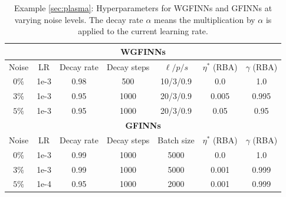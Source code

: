 \documentclass[final]{siamltex}
\begin{document}
\begin{appendices}
\begin{table}[t]
\centering
\begin{tabular}{|c||c|c|c|c|c|c|}
\hline
\multicolumn{7}{|c|}{\textbf{WGFINNs}} \\
\hline
Noise  & LR & Decay rate & Decay steps & $\ell/p/s$ & $\eta^*$ (RBA) & $\gamma$ (RBA) \\
\hline
$0\%$ & 1e-3   & 0.98 & 500 & 10/3/0.9  & 0.0 & 1.0\\
\hline
$3\%$ & 1e-3  & 0.95 & 1000 &  20/3/0.9  & 0.005 &  0.995\\
\hline
$5\%$ & 1e-3  & 0.95 & 1000 &  20/3/0.9  & 0.05 & 0.95\\
\hline\hline
\multicolumn{7}{|c|}{\textbf{GFINNs}} \\
\hline
Noise& LR & Decay rate & Decay steps & Batch size & $\eta^*$ (RBA) & $\gamma$ (RBA) \\
\hline
$0\%$ & 1e-3 & 0.99 & 1000 & 5000 & 0.0  & 1.0 \\
\hline
$3\%$ & 1e-3 & 0.99 & 1000 & 5000 & 0.001 &  0.999 \\
\hline
$5\%$ & 1e-4 & 0.95 & 1000 & 2000 & 0.001  & 0.999 \\
\hline
\end{tabular}
\caption{Example \ref{sec:plasma}: Hyperparameters for WGFINNs and GFINNs at varying noise levels. The decay rate $\alpha$ means the multiplication by $\alpha$ is applied to the current learning rate.}
\label{tab:Hyperparameters_PL}
\end{table}
\end{appendices}
% 




% 

\clearpage

%








\end{document}
